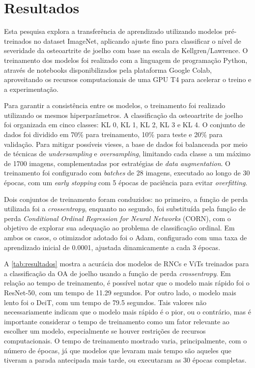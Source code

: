 \chapter{Resultados}\label{cap:resultados}

Esta pesquisa explora a transferência de aprendizado utilizando modelos pré-treinados no dataset ImageNet, aplicando ajuste fino para classificar o nível de severidade da osteoartrite de joelho com base na escala de Kellgren/Lawrence. O treinamento dos modelos foi realizado com a linguagem de programação Python, através de notebooks disponibilizados pela plataforma Google Colab, aproveitando os recursos computacionais de uma GPU T4 para acelerar o treino e a experimentação.

Para garantir a consistência entre os modelos, o treinamento foi realizado utilizando os mesmos hiperparâmetros. A classificação da osteoartrite de joelho foi organizada em cinco classes: KL 0, KL 1, KL 2, KL 3 e KL 4. O conjunto de dados foi dividido em 70\% para treinamento, 10\% para teste e 20\% para validação. Para mitigar possíveis vieses, a base de dados foi balanceada por meio de técnicas de \textit{undersampling} e \textit{oversampling}, limitando cada classe a um máximo de 1700 imagens, complementadas por estratégias de \textit{data augmentation}. O treinamento foi configurado com \textit{batches} de 28 imagens, executado ao longo de 30 épocas, com um \textit{early stopping} com 5 épocas de paciência para evitar \textit{overfitting}.

Dois conjuntos de treinamento foram conduzidos: no primeiro, a função de perda utilizada foi a \textit{crossentropy}, enquanto no segundo, foi substituída pela função de perda \textit{Conditional Ordinal Regression for Neural Networks} (CORN), com o objetivo de explorar sua adequação ao problema de classificação ordinal. Em ambos os casos, o otimizador adotado foi o Adam, configurado com uma taxa de aprendizado inicial de 0.0001, ajustada dinamicamente a cada 3 épocas.

A \autoref{tab:resultados} mostra a acurácia dos modelos de RNCs e ViTs treinados para a classificação da OA de joelho usando a função de perda \textit{crossentropy}. Em relação ao tempo de treinamento, é possível notar que o modelo mais rápido foi o ResNet-50, com um tempo de 11.29 segundos. Por outro lado, o modelo mais lento foi o DeiT, com um tempo de 79.5 segundos. Tais valores não necessariamente indicam que o modelo mais rápido é o pior, ou o contrário, mas é importante considerar o tempo de treinamento como um fator relevante ao escolher um modelo, especialmente se houver restrições de recursos computacionais. O tempo de treinamento mostrado varia, principalmente, com o número de épocas, já que modelos que levaram mais tempo são aqueles que tiveram a parada antecipada mais tarde, ou executaram as 30 épocas completas.

